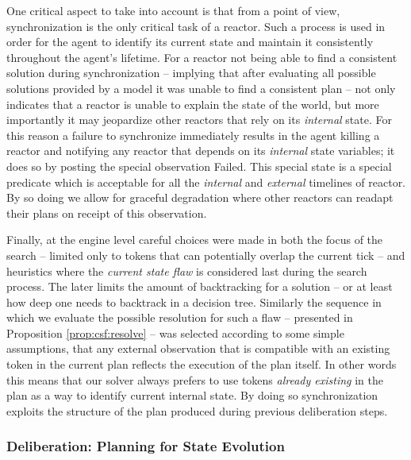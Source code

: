 One critical aspect to take into account is that from a \rx point of
view, synchronization is the only critical task of a reactor. Such a
process is used in order for the agent to identify its current state
and maintain it consistently throughout the agent's lifetime. For a
reactor not being able to find a consistent solution during
synchronization -- implying that after evaluating all possible
solutions provided by a model it was unable to find a consistent plan
-- not only indicates that a reactor is unable to explain the state of
the world, but more importantly it may jeopardize other reactors that
rely on its {\em internal} state. For this reason a failure to
synchronize immediately results in the \rx agent killing a reactor and
notifying any reactor that depends on its {\em internal} state
variables; it does so by posting the special observation
\textsf{Failed}. This special state is a special predicate which is
acceptable for all the {\em internal} and {\em external} timelines of
 \eu reactor.  By so doing we allow for graceful
degradation where other reactors can readapt their plans on receipt of
this observation.

Finally, at the engine level careful choices were made in both the
focus of the search -- limited only to tokens that can potentially
overlap the current tick -- and heuristics where the {\em current
  state flaw} is considered last during the search process. The later
limits the amount of backtracking for a solution -- or at least how
deep one needs to backtrack in a decision tree.  Similarly the
sequence in which we evaluate the possible resolution for such a flaw
-- presented in Proposition \ref{prop:csf:resolve} -- was selected
according to some simple assumptions, that any external observation
that is compatible with an existing token in the current plan reflects
the execution of the plan itself. In other words this means that our
solver always prefers to use tokens \emph{already existing} in the
plan as a way to identify current internal state. By doing so
synchronization exploits the structure of the plan produced during
previous deliberation steps.


\subsubsection{Deliberation: Planning for  State Evolution}
\label{sec:arch:plan}

